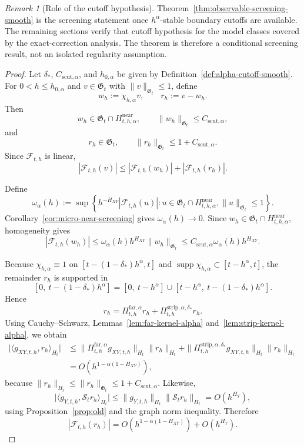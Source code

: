 \documentclass[11pt,a4paper]{amsart}
\theoremstyle{plain}
\theoremstyle{definition}
\theoremstyle{remark}
\newtheorem{remark}[theorem]{Remark}
\begin{document}
\begin{remark}[Role of the cutoff hypothesis]
Theorem~\ref{thm:observable-screening-smooth} is the screening statement once
\(h^\alpha\)-stable boundary cutoffs are available.  The remaining sections verify that cutoff
hypothesis for the model classes covered by the exact-correction analysis.  The theorem is therefore
a conditional screening result, not an isolated regularity assumption.
\end{remark}

\begin{proof}
Let \(\delta_*\), \(C_{\mathrm{scut},\alpha}\), and \(h_{0,\alpha}\) be given by
Definition~\ref{def:alpha-cutoff-smooth}. For \(0<h\le h_{0,\alpha}\) and \(v\in\mathfrak G_t\)
with \(\|v\|_{\mathfrak G_t}\le1\), define
\[
w_h:=\chi_{h,\alpha}v,
\qquad
r_h:=v-w_h.
\]
Then
\[
w_h\in\mathfrak G_t\cap H_{t,h,\alpha}^{\mathrm{near}},
\qquad
\|w_h\|_{\mathfrak G_t}\le C_{\mathrm{scut},\alpha},
\]
and
\[
r_h\in\mathfrak G_t,
\qquad
\|r_h\|_{\mathfrak G_t}\le 1+C_{\mathrm{scut},\alpha}.
\]
Since \(\mathcal F_{t,h}\) is linear,
\[
|\mathcal F_{t,h}(v)|
\le
|\mathcal F_{t,h}(w_h)|
+
|\mathcal F_{t,h}(r_h)|.
\]

Define
\[
\omega_\alpha(h)
:=
\sup\left\{
h^{-H_{XY}}|\mathcal F_{t,h}(u)|:
u\in\mathfrak G_t\cap H_{t,h,\alpha}^{\mathrm{near}},
\|u\|_{\mathfrak G_t}\le1
\right\}.
\]
Corollary~\ref{cor:micro-near-screening} gives $\omega_\alpha(h)\to0$. Since
$w_h\in\mathfrak G_t\cap H_{t,h,\alpha}^{\mathrm{near}}$, homogeneity gives
\[
|\mathcal F_{t,h}(w_h)|
\le
\omega_\alpha(h)h^{H_{XY}}\|w_h\|_{\mathfrak G_t}
\le
C_{\mathrm{scut},\alpha}\omega_\alpha(h)h^{H_{XY}}.
\]

Because \(\chi_{h,\alpha}\equiv1\) on \([t-(1-\delta_*)h^\alpha,t]\) and
\(\operatorname{supp}\chi_{h,\alpha}\subset[t-h^\alpha,t]\), the remainder \(r_h\) is supported in
\[
[0,\ t-(1-\delta_*)h^\alpha]
=
[0,\ t-h^\alpha]\cup[t-h^\alpha,\ t-(1-\delta_*)h^\alpha].
\]
Hence
\[
r_h
=
\Pi_{t,h}^{\mathrm{far},\alpha}r_h
+
\Pi_{t,h}^{\mathrm{strip},\alpha,\delta_*}r_h.
\]
Using Cauchy--Schwarz, Lemmas~\ref{lem:far-kernel-alpha} and~\ref{lem:strip-kernel-alpha}, we obtain
\begin{align*}
\bigl|
\langle g_{XY,t,h},r_h\rangle_{H_t}
\bigr|
&\le
\|\Pi_{t,h}^{\mathrm{far},\alpha}g_{XY,t,h}\|_{H_t}\|r_h\|_{H_t}
+
\|\Pi_{t,h}^{\mathrm{strip},\alpha,\delta_*}g_{XY,t,h}\|_{H_t}\|r_h\|_{H_t}\\
&=
O\!\left(h^{1-\alpha(1-H_{XY})}\right),
\end{align*}
because \(\|r_h\|_{H_t}\le \|r_h\|_{\mathfrak G_t}\le 1+C_{\mathrm{scut},\alpha}\).
Likewise,
\[
\bigl|
\langle g_{Y,t,h},\mathcal S_t r_h\rangle_{H_t}
\bigr|
\le
\|g_{Y,t,h}\|_{H_t}\|\mathcal S_t r_h\|_{H_t}
=
O(h^{H_Y}),
\]
using Proposition~\ref{prop:old} and the graph norm inequality. Therefore
\[
|\mathcal F_{t,h}(r_h)|
=
O\!\left(h^{1-\alpha(1-H_{XY})}\right)
+
O(h^{H_Y}).
\]


\end{proof}
\end{document}

